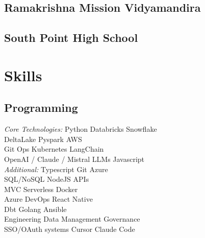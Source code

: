 \documentclass[]{deedy-resume-reversed}
\begin{document}
\begin{multicols}{2}
\needspace{1.5cm}
\subsection{Ramakrishna Mission Vidyamandira}
\sectionsep

\needspace{1.5cm}
\subsection{South Point High School}
\sectionsep


\needspace{3cm}
\vspace{\topsep} %

\section{Skills}
\needspace{3cm}
\vspace{\topsep} %

\subsection{Programming}
\textit{Core Technologies:} \newline
Python \textbullet{} Databricks  \textbullet{} Snowflake \\
DeltaLake \textbullet{} Pyspark  \textbullet{} AWS \\
Git Ops \textbullet{} Kubernetes \textbullet{} LangChain \\
OpenAI / Claude / Mistral \textbullet{} LLMs \textbullet{} Javascript \\
\textit{Additional:} \newline
Typescript \textbullet{} Git \textbullet{} Azure \\
SQL/NoSQL \textbullet{} NodeJS \textbullet{} APIs \\
MVC \textbullet{} Serverless \textbullet{} Docker \\
Azure DevOps \textbullet{} React Native \\
Dbt \textbullet{} Golang \textbullet{} Ansible  \\
Engineering Data Management \textbullet{} Governance \\
SSO/OAuth systems \textbullet{} Cursor \textbullet{} Claude Code \\


\end{multicols}
\end{document}
